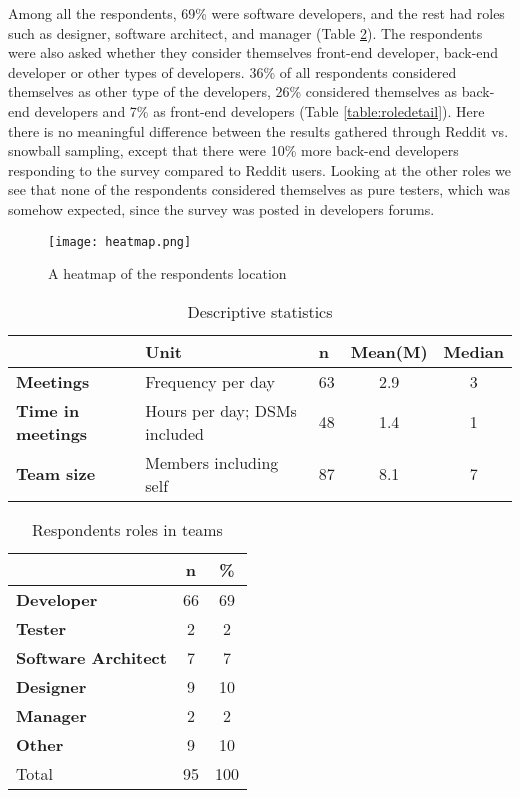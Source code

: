 Among all the respondents, 69\% were software developers, and the rest had roles such as designer, software architect, and manager (Table \ref{table:roles}). The respondents were also asked whether they consider themselves front-end developer, back-end developer or other types of developers. 36\% of all respondents considered themselves as other type of the developers, 26\% considered themselves as back-end developers and 7\% as front-end developers (Table \ref{table:roledetail}). Here there is no meaningful difference between the results gathered through Reddit vs. snowball sampling, except that there were 10\% more back-end developers responding to the survey compared to Reddit users. Looking at the other roles we see that none of the respondents considered themselves as pure testers, which was somehow expected, since the survey was posted in developers forums. 

\begin{figure}[hbt!]
\centering
\texttt{[image: heatmap.png]}
\caption{A heatmap of the respondents location}\label{fig:heatmap}
\end{figure}


\begin{table}
\centering
\caption{Descriptive statistics} \label{table:ds}
\begin{tabular}{lllcc}
\hline
 & \textbf{Unit} & \textbf{n} & \textbf{Mean(M)} & \textbf{Median} \\ \hline
\textbf{Meetings} & Frequency per day & 63 & 2.9 & 3 \\
\textbf{Time in meetings} & Hours per day; DSMs included & 48 & 1.4 & 1 \\
\textbf{Team size} & Members including self & 87 & 8.1 & 7 \\
\hline
\end{tabular}
\end{table}



\begin{table}
\centering
\caption{Respondents roles in teams} \label{table:roles}
\begin{tabular}{lcc}
\hline
 & \textbf{n} & \textbf{\%} \\ \hline
\textbf{Developer}&66&69\\
\textbf{Tester}&2&2\\
\textbf{Software Architect}&7&7\\
\textbf{Designer}&9&10\\
\textbf{Manager}&2&2\\
\textbf{Other}&9&10\\
Total&95&100\\
\hline
\end{tabular}
\end{table}



